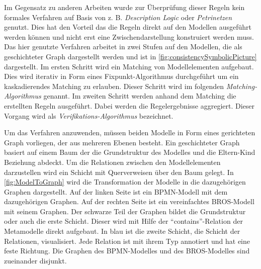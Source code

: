 Im Gegensatz zu anderen Arbeiten wurde zur Überprüfung dieser Regeln kein formales Verfahren auf Basis von z. B. \emph{Description Logic} oder \emph{Petrinetzen} genutzt.
Dies hat den Vorteil das die Regeln direkt auf den Modellen ausgeführt werden können und nicht erst eine Zwischendarstellung konstruiert werden muss.
Das hier genutzte Verfahren arbeitet in zwei Stufen auf den Modellen, die als geschichteter Graph dargestellt werden und ist in \cref{fig:consistencySymbolicPicture} dargestellt.
Im ersten Schritt wird ein Matching von Modellelementen aufgebaut.
Dies wird iterativ in Form eines Fixpunkt-Algorithmus durchgeführt um ein kaskadierendes Matching zu erlauben.
Dieser Schritt wird im folgenden \emph{Matching-Algorithmus} genannt.
Im zweiten Schritt werden anhand dem Matching die erstellten Regeln ausgeführt.
Dabei werden die Regelergebnisse aggregiert.
Dieser Vorgang wird als \emph{Verifikations-Algorithmus} bezeichnet.

Um das Verfahren anzuwenden, müssen beiden Modelle in Form eines gerichteten Graph vorliegen, der aus mehreren Ebenen besteht.
Ein geschichteter Graph basiert auf einem Baum der die Grundstruktur des Modelles und die Eltern-Kind Beziehung abdeckt.
Um die Relationen zwischen den Modellelementen darzustellen wird ein Schicht mit Querverweisen über den Baum gelegt.
In \cref{fig:ModelToGraph} wird die Transformation der Modelle in die dazugehörigen Graphen dargestellt.
Auf der linken Seite ist ein BPMN-Modell mit dem dazugehörigen Graphen. 
Auf der rechten Seite ist ein vereinfachtes BROS-Modell mit seinem Graphen.
Der schwarze Teil der Graphen bildet die Grundstruktur oder auch die erste Schicht.
Dieser wird mit Hilfe der ``contains''-Relation der Metamodelle direkt aufgebaut.
In blau ist die zweite Schicht, die Schicht der Relationen, visualisiert.
Jede Relation ist mit ihrem Typ annotiert und hat eine feste Richtung.
Die Graphen des BPMN-Modelles und des BROS-Modelles sind zueinander disjunkt.


